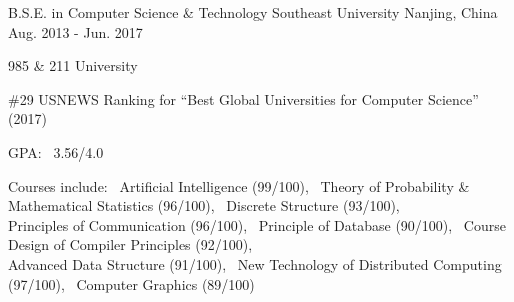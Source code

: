 

\begin{cventries}

  \cventry
    {B.S.E. in Computer Science \& Technology} %
    {Southeast University} %
    {Nanjing, China} %
    {Aug. 2013 - Jun. 2017} %
    {
      \begin{cvitems} %
        \item {985 \& 211 University}
        \item {\#29 USNEWS Ranking for ``Best Global Universities for Computer Science'' (2017)}
        \item {GPA: \ 3.56/4.0}
        \item {Courses include: \ Artificial Intelligence (99/100), \ Theory of Probability \& Mathematical Statistics (96/100), \  Discrete Structure (93/100), \\ Principles of Communication (96/100), \ Principle of Database (90/100), \ Course Design of Compiler Principles (92/100)}, \\ Advanced Data Structure (91/100), \ New Technology of Distributed Computing (97/100), \  Computer Graphics (89/100)
      \end{cvitems} 
    }
    
\end{cventries}